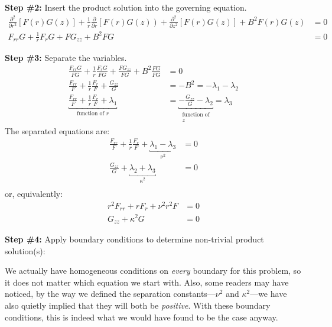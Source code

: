 \noindent\textbf{Step \#2:} Insert the product solution into the governing equation.
\begin{align*}
\frac{\partial^2}{\partial r^2}\left[F(r)G(z)\right] + \frac{1}{r}\frac{\partial}{\partial r}\left[F(r)G(z)\right) + \frac{\partial^2}{\partial z^2}\left[F(r)G(z)\right] + B^2F(r)G(z) &= 0 \\
F_{rr}G + \frac{1}{r}F_rG + FG_{zz} + B^2FG &= 0
\end{align*}

\vspace{0.25cm}

\noindent\textbf{Step \#3:} Separate the variables.
\begin{align*}
\frac{F_{rr}G}{FG} + \frac{1}{r}\frac{F_r G}{FG} + \frac{FG_{zz}}{FG} + B^2\frac{FG}{FG} &= 0 \\
\frac{F_{rr}}{F} + \frac{1}{r}\frac{F_r}{F} + \frac{G_{zz}}{G} &= -B^2 = -\lambda_1 -\lambda_2 \\
\underbracket{\frac{F_{rr}}{F} + \frac{1}{r}\frac{F_r}{F} + \lambda_1}_{\text{function of }r} &= \underbracket{-\frac{G_{zz}}{G} - \lambda_2}_{\substack{\text{function of} \\ z}} = \lambda_3 
\end{align*}
 The separated equations are:
\begin{align*}
\frac{F_{rr}}{F} + \frac{1}{r}\frac{F_r}{F} + \underbracket{\lambda_1 - \lambda_3}_{\nu^2} &= 0 \\
\frac{G_{zz}}{G} + \underbracket{\lambda_2 + \lambda_3}_{\kappa^2} &= 0 \\
\end{align*}
or, equivalently:
\begin{align*}
r^2F_{rr} + rF_{r} + \nu^2r^2F &= 0 \\
G_{zz} + \kappa^2G &= 0
\end{align*}

\vspace{0.25cm}

\noindent\textbf{Step \#4:} Apply boundary conditions to determine non-trivial product solution(s):

\vspace{0.25cm}

\noindent We actually have homogeneous conditions on \emph{every} boundary for this problem, so it does not matter which equation we start with. Also, some readers may have noticed, by the way we defined the separation constants---$\nu^2$ and $\kappa^2$---we have also quietly implied that they will both be \emph{positive}.  With these boundary conditions, this is indeed what we would have found to be the case anyway.

